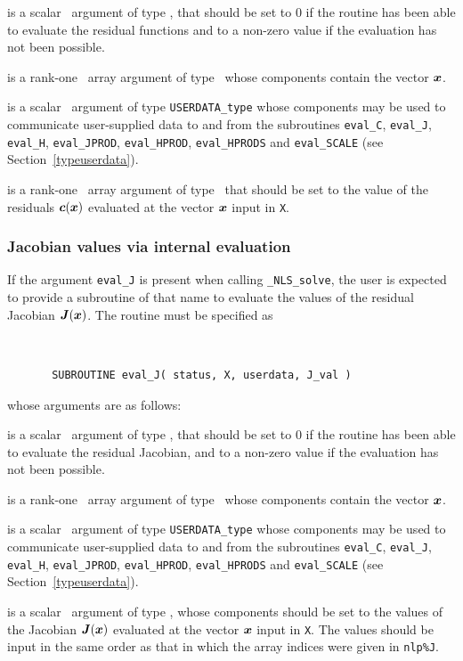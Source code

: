 \documentclass{galahad}
\newcommand{\packagename}{NLS}
\newcommand{\fullpackagename}{\libraryname\_\packagename}
\newcommand{\solver}{{\tt \fullpackagename\_solve}}
\begin{document}
\begin{description}
 is a scalar \intentout\ argument of type \integer,
that should be set to 0 if the routine has been able to evaluate
the residual functions
and to a non-zero value if the evaluation has not been possible.

 is a rank-one \intentin\ array argument of type \realdp\
whose components contain the vector ${\bm{x}}$.

 is a scalar \intentinout\ argument of type
{\tt USERDATA\_type} whose components may be used
to communicate user-supplied data to and from the subroutines
{\tt eval\_C}, {\tt eval\_J}, {\tt eval\_H}, {\tt eval\_JPROD},
{\tt eval\_HPROD}, {\tt eval\_HPRODS} and {\tt eval\_SCALE}
(see Section~\ref{typeuserdata}).

 is a rank-one \intentout\ array argument of type \realdp\
that should be set to the value of the residuals ${\bm{c}}({\bm{x}})$
evaluated at the vector ${\bm{x}}$ input in {\tt X}.

\end{description}


\subsubsection{Jacobian values via internal evaluation\label{jfv}}

If the argument {\tt eval\_J} is present when calling \solver, the
user is expected to provide a subroutine of that name to evaluate the
values of the residual Jacobian ${\bm{J}}({\bm{x}})$.
The routine must be specified as

\def\baselinestretch{0.8}
{\tt
\begin{verbatim}
       SUBROUTINE eval_J( status, X, userdata, J_val )
\end{verbatim} }
\def\baselinestretch{1.0}
\noindent whose arguments are as follows:

\begin{description}
 is a scalar \intentout\ argument of type \integer,
that should be set to 0 if the routine has been able to evaluate
the residual Jacobian,
and to a non-zero value if the evaluation has not been possible.

\ittf{X} is a rank-one \intentin\ array argument of type \realdp\
whose components contain the vector ${\bm{x}}$.

\itt{userdata} is a scalar \intentinout\ argument of type
{\tt USERDATA\_type} whose components may be used
to communicate user-supplied data to and from the subroutines
{\tt eval\_C}, {\tt eval\_J}, {\tt eval\_H}, {\tt eval\_JPROD},
{\tt eval\_HPROD}, {\tt eval\_HPRODS} and {\tt eval\_SCALE}
(see Section~\ref{typeuserdata}).

\itt{J\_val} is a scalar \intentout\ argument of type \realdp,
whose components should be set to the values
of the Jacobian ${\bm{J}}({\bm{x}})$
evaluated at the vector ${\bm{x}}$ input in {\tt X}.
The values should
be input in the same order as that in which the array indices were
given in {\tt nlp\%J}.

\end{description}
\end{document}
